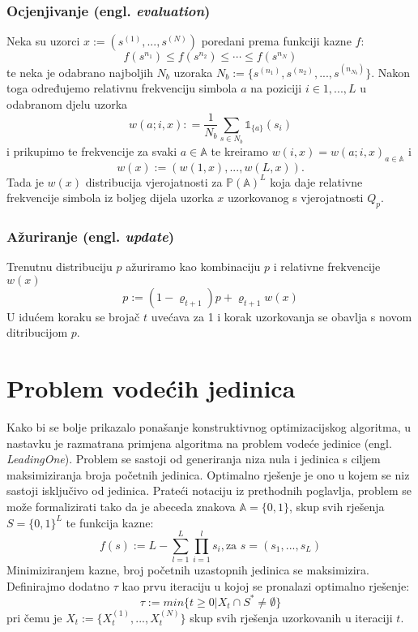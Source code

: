\documentclass[times, utf8, zavrsni]{fer}
\begin{document}
\subsection{Ocjenjivanje (engl. \textit{evaluation})}
Neka su uzorci $x := (s^{(1)},...,s^{(N)})$ poredani prema funkciji kazne $f$:
$$
f(s^{n_1}) \leq f(s^{n_2}) \leq \cdots \leq f(s^{n_N})
$$
te neka je odabrano najboljih $N_b$ uzoraka $N_b := \{ s^{(n_1)}, s^{(n_2)},...,s^{(n_{N_b})} \}$. Nakon toga određujemo relativnu frekvenciju simbola $a$ na poziciji $i \in {1,..., L}$
u odabranom djelu uzorka
$$
w(a; i, x) : = \frac{1}{N_b} \sum_{s \in N_b} \mathds{1}_{\{a\}}(s_i)
$$
i prikupimo te frekvencije za svaki $a \in \mathbb{A}$ te kreiramo $w(i, x) = w(a;i, x)_{a \in \mathbb{A}}$ i
$$
w(x) := (w(1, x),...,w(L, x)).
$$
Tada je $w(x)$ distribucija vjerojatnosti za $\mathbb{P}(\mathbb{A})^L$ koja daje relativne frekvencije simbola iz boljeg dijela uzorka $x$ uzorkovanog s vjerojatnosti $Q_p$.

\subsection{Ažuriranje (engl. \textit{update})}
Trenutnu distribuciju $p$ ažuriramo kao kombinaciju $p$ i relativne frekvencije $w(x)$
$$
p := (1 - \varrho_{t+1})p + \varrho_{t+1} w(x)
$$
U idućem koraku se brojač $t$ uvećava za 1 i korak uzorkovanja se obavlja s novom ditribucijom $p$.


\chapter{Problem vodećih jedinica}
Kako bi se bolje prikazalo ponašanje konstruktivnog optimizacijskog algoritma, u nastavku je razmatrana primjena algoritma na
problem vodeće jedinice (engl. \textit{LeadingOne}). Problem se sastoji od generiranja niza nula i jedinica s ciljem maksimiziranja broja početnih jedinica. Optimalno
rješenje je ono u kojem se niz sastoji isključivo od jedinica. Prateći notaciju iz prethodnih poglavlja, problem se može formalizirati tako da
je abeceda znakova $\mathbb{A} = \{0, 1\}$, skup svih rješenja $S = \{0, 1\}^L$ te funkcija kazne:
$$
f(s) := L - \sum^L_{l=1} \prod^l_{i=1} s_i, \text{za }  s=(s_1,..., s_L)
$$
Minimiziranjem kazne, broj početnih uzastopnih jedinica se maksimizira.
Definirajmo dodatno $\tau$ kao prvu iteraciju u kojoj se pronalazi optimalno rješenje:
$$
\tau := min \{ t \geq 0 | X_t \cap S^* \neq \emptyset \}
$$
pri čemu je $X_t :=  \{ X^{(1)}_t,...,X^{(N)}_t \} $ skup svih rješenja uzorkovanih u iteraciji $t$.
\end{document}
